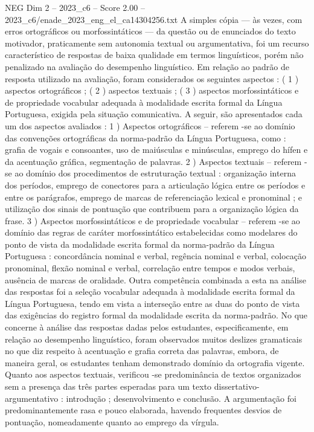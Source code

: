 \begin{textsample}{NEG Dim 2 – 2023\_c6 – Score 2.00 – 2023\_c6/enade\_2023\_eng\_el\_ca14304256.txt}
A simples cópia — às vezes, com erros ortográficos ou morfossintáticos — da questão ou de enunciados do texto motivador, praticamente sem autonomia textual ou argumentativa, foi um recurso característico de respostas de baixa qualidade em termos linguísticos, porém não penalizado na avaliação do desempenho linguístico.
Em relação ao padrão de resposta utilizado na avaliação, foram considerados os seguintes aspectos : ( 1 ) aspectos ortográficos ; ( 2 ) aspectos textuais ; ( 3 ) aspectos morfossintáticos e de propriedade vocabular adequada à modalidade escrita formal da Língua Portuguesa, exigida pela situação comunicativa.
A seguir, são apresentados cada um dos aspectos avaliados : 1 ) Aspectos ortográficos – referem -se ao domínio das convenções ortográficas da norma-padrão da Língua Portuguesa, como : grafia de vogais e consoantes, uso de maiúsculas e minúsculas, emprego do hífen e da acentuação gráfica, segmentação de palavras. 2 ) Aspectos textuais – referem -se ao domínio dos procedimentos de estruturação textual : organização interna dos períodos, emprego de conectores para a articulação lógica entre os períodos e entre os parágrafos, emprego de marcas de referenciação lexical e pronominal ; e utilização dos sinais de pontuação que contribuem para a organização lógica da frase. 3 ) Aspectos morfossintáticos e de propriedade vocabular – referem -se ao domínio das regras de caráter morfossintático estabelecidas como modelares do ponto de vista da modalidade escrita formal da norma-padrão da Língua Portuguesa : concordância nominal e verbal, regência nominal e verbal, colocação pronominal, flexão nominal e verbal, correlação entre tempos e modos verbais, ausência de marcas de oralidade.
Outra competência combinada a esta na análise das respostas foi a seleção vocabular adequada à modalidade escrita formal da Língua Portuguesa, tendo em vista a interseção entre as duas do ponto de vista das exigências do registro formal da modalidade escrita da norma-padrão.
No que concerne à análise das respostas dadas pelos estudantes, especificamente, em relação ao desempenho linguístico, foram observados muitos deslizes gramaticais no que diz respeito à acentuação e grafia correta das palavras, embora, de maneira geral, os estudantes tenham demonstrado domínio da ortografia vigente.
Quanto aos aspectos textuais, verificou -se predominância de textos organizados sem a presença das três partes esperadas para um texto dissertativo-argumentativo : introdução ; desenvolvimento e conclusão.
A argumentação foi predominantemente rasa e pouco elaborada, havendo frequentes desvios de pontuação, nomeadamente quanto ao emprego da vírgula.

\end{textsample}
